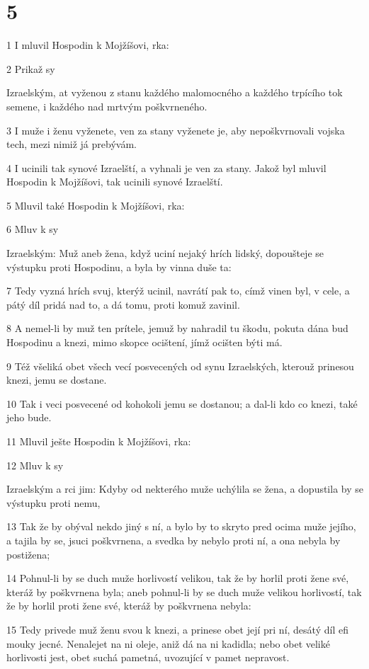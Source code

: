 \chapter{5}

\par 1 I mluvil Hospodin k Mojžíšovi, rka:
\par 2 Prikaž sy\par Izraelským, at vyženou z stanu každého malomocného a každého trpícího tok semene, i každého nad mrtvým poškvrneného.
\par 3 I muže i ženu vyženete, ven za stany vyženete je, aby nepoškvrnovali vojska tech, mezi nimiž já prebývám.
\par 4 I ucinili tak synové Izraelští, a vyhnali je ven za stany. Jakož byl mluvil Hospodin k Mojžíšovi, tak ucinili synové Izraelští.
\par 5 Mluvil také Hospodin k Mojžíšovi, rka:
\par 6 Mluv k sy\par Izraelským: Muž aneb žena, když uciní nejaký hrích lidský, dopoušteje se výstupku proti Hospodinu, a byla by vinna duše ta:
\par 7 Tedy vyzná hrích svuj, kterýž ucinil, navrátí pak to, címž vinen byl, v cele, a pátý díl pridá nad to, a dá tomu, proti komuž zavinil.
\par 8 A nemel-li by muž ten prítele, jemuž by nahradil tu škodu, pokuta dána bud Hospodinu a knezi, mimo skopce ocištení, jímž ocišten býti má.
\par 9 Též všeliká obet všech vecí posvecených od synu Izraelských, kterouž prinesou knezi, jemu se dostane.
\par 10 Tak i veci posvecené od kohokoli jemu se dostanou; a dal-li kdo co knezi, také jeho bude.
\par 11 Mluvil ješte Hospodin k Mojžíšovi, rka:
\par 12 Mluv k sy\par Izraelským a rci jim: Kdyby od nekterého muže uchýlila se žena, a dopustila by se výstupku proti nemu,
\par 13 Tak že by obýval nekdo jiný s ní, a bylo by to skryto pred ocima muže jejího, a tajila by se, jsuci poškvrnena, a svedka by nebylo proti ní, a ona nebyla by postižena;
\par 14 Pohnul-li by se duch muže horlivostí velikou, tak že by horlil proti žene své, kteráž by poškvrnena byla; aneb pohnul-li by se duch muže velikou horlivostí, tak že by horlil proti žene své, kteráž by poškvrnena nebyla:
\par 15 Tedy privede muž ženu svou k knezi, a prinese obet její pri ní, desátý díl efi mouky jecné. Nenalejet na ni oleje, aniž dá na ni kadidla; nebo obet veliké horlivosti jest, obet suchá pametná, uvozující v pamet nepravost.

